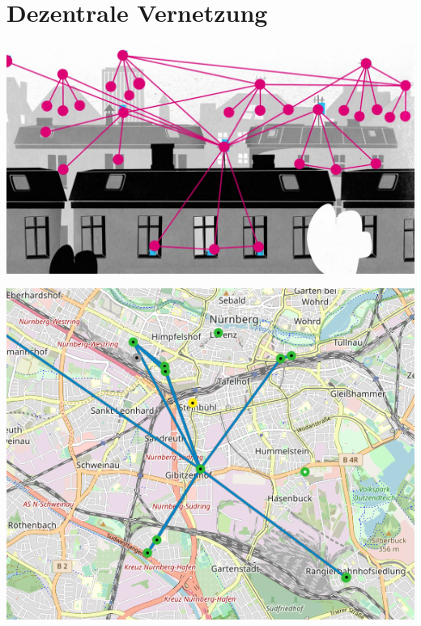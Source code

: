 \documentclass{beamer}
\begin{document}
	\section{Dezentrale Vernetzung}
	\begin{frame}
		\includegraphics[width=\framewidth]{media/dachzudach.png}
	\end{frame}
	\begin{frame}
		\includegraphics[height=\textheight]{media/rf_nbg.png}
	\end{frame}
\end{document}
